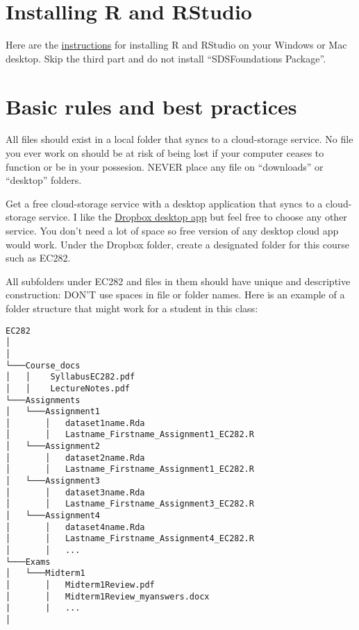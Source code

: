 \documentclass[
]{book}
\begin{document}
\hypertarget{installing-r-and-rstudio}{%
\section{Installing R and RStudio}\label{installing-r-and-rstudio}}

Here are the \href{https://courses.edx.org/courses/UTAustinX/UT.7.01x/3T2014/56c5437b88fa43cf828bff5371c6a924/}{instructions} for installing R and RStudio on your Windows or Mac desktop. Skip the third part and do not install ``SDSFoundations Package''.

\hypertarget{basic-rules-and-best-practices}{%
\section{Basic rules and best practices}\label{basic-rules-and-best-practices}}

All files should exist in a local folder that syncs to a cloud-storage service. No file you ever work on should be at risk of being lost if your computer ceases to function or be in your possesion. NEVER place any file on ``downloads'' or ``desktop'' folders.

Get a free cloud-storage service with a desktop application that syncs to a cloud-storage service. I like the \href{https://help.dropbox.com/installs-integrations/desktop/desktop-application-overview}{Dropbox desktop app} but feel free to choose any other service. You don't need a lot of space so free version of any desktop cloud app would work. Under the Dropbox folder, create a designated folder for this course such as EC282.

All subfolders under EC282 and files in them should have unique and descriptive construction: DON'T use spaces in file or folder names. Here is an example of a folder structure that might work for a student in this class:

\begin{verbatim}
EC282
│  
│
└───Course_docs
│   │    SyllabusEC282.pdf
│   │    LectureNotes.pdf 
└───Assignments
│   └───Assignment1
│       │   dataset1name.Rda
│       │   Lastname_Firstname_Assignment1_EC282.R
│   └───Assignment2
│       │   dataset2name.Rda
│       │   Lastname_Firstname_Assignment1_EC282.R
│   └───Assignment3
│       │   dataset3name.Rda
│       │   Lastname_Firstname_Assignment3_EC282.R
│   └───Assignment4
│       │   dataset4name.Rda
│       │   Lastname_Firstname_Assignment4_EC282.R
│       │   ...
└───Exams
│   └───Midterm1
│       │   Midterm1Review.pdf
│       │   Midterm1Review_myanswers.docx
|       |   ...
│   
\end{verbatim}
\end{document}

